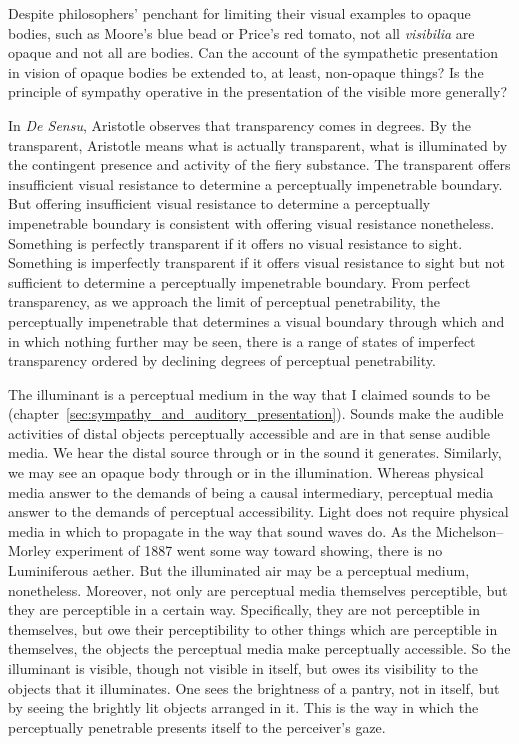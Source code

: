 Despite philosophers' penchant for limiting their visual examples to opaque bodies, such as Moore's \citeyearpar{Moore:1903uo} blue bead or Price's \citeyearpar{Price:1932fk} red tomato, not all \emph{visibilia} are opaque and not all are bodies. Can the account of the sympathetic presentation in vision of opaque bodies be extended to, at least, non-opaque things? Is the principle of sympathy operative in the presentation of the visible more generally?

In \emph{De Sensu}, Aristotle observes that transparency comes in degrees. By the transparent, Aristotle means what is actually transparent, what is illuminated by the contingent presence and activity of the fiery substance. The transparent offers insufficient visual resistance to determine a perceptually impenetrable boundary. But offering insufficient visual resistance to determine a perceptually impenetrable boundary is consistent with offering visual resistance nonetheless. Something is perfectly transparent if it offers no visual resistance to sight. Something is imperfectly transparent if it offers visual resistance to sight but not sufficient to determine a perceptually impenetrable boundary. From perfect transparency, as we approach the limit of perceptual penetrability, the perceptually impenetrable that determines a visual boundary through which and in which nothing further may be seen, there is a range of states of imperfect transparency ordered by declining degrees of perceptual penetrability. 

The illuminant is a perceptual medium in the way that I claimed sounds to be (chapter~\ref{sec:sympathy_and_auditory_presentation}). Sounds make the audible activities of distal objects perceptually accessible and are in that sense audible media. We hear the distal source through or in the sound it generates. Similarly, we may see an opaque body through or in the illumination. Whereas physical media answer to the demands of being a causal intermediary, perceptual media answer to the demands of perceptual accessibility. Light does not require physical media in which to propagate in the way that sound waves do. As the Michelson–Morley experiment of 1887 went some way toward showing, there is no Luminiferous aether. But the illuminated air may be a perceptual medium, nonetheless. Moreover, not only are perceptual media themselves perceptible, but they are perceptible in a certain way. Specifically, they are not perceptible in themselves, but owe their perceptibility to other things which are perceptible in themselves, the objects the perceptual media make perceptually accessible. So the illuminant is visible, though not visible in itself, but owes its visibility to the objects that it illuminates. One sees the brightness of a pantry, not in itself, but by seeing the brightly lit objects arranged in it. This is the way in which the perceptually penetrable presents itself to the perceiver's gaze.

